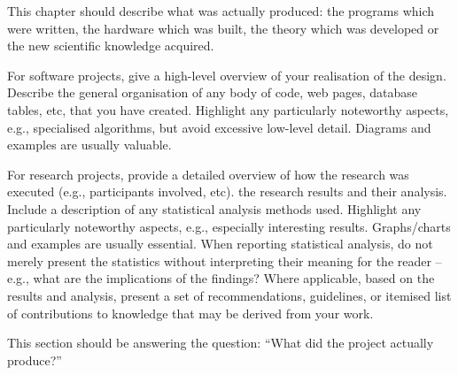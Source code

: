 This chapter should describe what was actually produced: the programs which
were written, the hardware which was built, the theory which was developed or
the new scientific knowledge acquired.

For software projects, give a high-level overview of your realisation of the
design. Describe the general organisation of any body of code, web pages,
database tables, etc, that you have created. Highlight any particularly
noteworthy aspects, e.g., specialised algorithms, but avoid excessive low-level
detail. Diagrams and examples are usually valuable.

For research projects, provide a detailed overview of how the research was
executed (e.g., participants involved, etc). the research results and their
analysis. Include a description of any statistical analysis methods used.
Highlight any particularly noteworthy aspects, e.g., especially interesting
results. Graphs/charts and examples are usually essential. When reporting
statistical analysis, do not merely present the statistics without interpreting
their meaning for the reader – e.g., what are the implications of the findings?
Where applicable, based on the results and analysis, present a set of
recommendations, guidelines, or itemised list of contributions to knowledge
that may be derived from your work.

This section should be answering the question: “What did the project actually
produce?”
